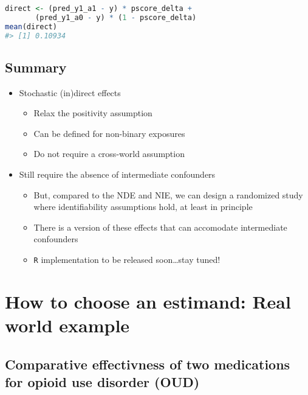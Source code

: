 \documentclass[
  12pt,
]{book}
\newcommand{\passthrough}[1]{#1}
\providecommand{\tightlist}{%
  \setlength{\itemsep}{0pt}\setlength{\parskip}{0pt}}
\theoremstyle{definition}
\theoremstyle{definition}
\theoremstyle{definition}
\newcommand{\1}{\mathbbm{1}}
\begin{document}
\begin{lstlisting}[language=R]
direct <- (pred_y1_a1 - y) * pscore_delta +
       (pred_y1_a0 - y) * (1 - pscore_delta)
mean(direct)
#> [1] 0.10934
\end{lstlisting}

\hypertarget{summary}{%
\section{Summary}\label{summary}}

\begin{itemize}
\tightlist
\item
  Stochastic (in)direct effects

  \begin{itemize}
  \tightlist
  \item
    Relax the positivity assumption
  \item
    Can be defined for non-binary exposures
  \item
    Do not require a cross-world assumption
  \end{itemize}
\item
  Still require the absence of intermediate confounders

  \begin{itemize}
  \tightlist
  \item
    But, compared to the NDE and NIE, we can design a randomized study where
    identifiability assumptions hold, at least in principle
  \item
    There is a version of these effects that can accomodate intermediate
    confounders \citep{hejazi2020nonparametric}
  \item
    \passthrough{\lstinline!R!} implementation to be released soon\ldots stay tuned!
  \end{itemize}
\end{itemize}

\hypertarget{estimandirl}{%
\chapter{How to choose an estimand: Real world example}\label{estimandirl}}

\hypertarget{comparative-effectivness-of-two-medications-for-opioid-use-disorder-oud}{%
\section{Comparative effectivness of two medications for opioid use disorder (OUD)}\label{comparative-effectivness-of-two-medications-for-opioid-use-disorder-oud}}
\end{document}
